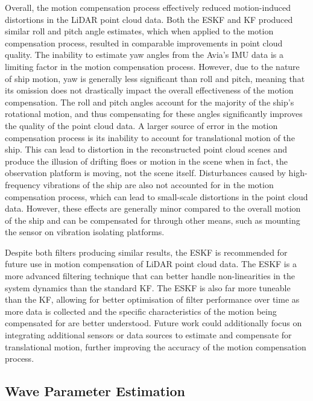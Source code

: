 Overall, the motion compensation process effectively reduced motion-induced distortions in the \ac{LiDAR} point cloud data. Both the \ac{ESKF} and \ac{KF} produced similar roll and pitch angle estimates, which when applied to the motion compensation process, resulted in comparable improvements in point cloud quality. The inability to estimate yaw angles from the Avia's \ac{IMU} data is a limiting factor in the motion compensation process. However, due to the nature of ship motion, yaw is generally less significant than roll and pitch, meaning that its omission does not drastically impact the overall effectiveness of the motion compensation. The roll and pitch angles account for the majority of the ship's rotational motion, and thus compensating for these angles significantly improves the quality of the point cloud data. A larger source of error in the motion compensation process is its inability to account for translational motion of the ship. This can lead to distortion in the reconstructed point cloud scenes and produce the illusion of drifting floes or motion in the scene when in fact, the observation platform is moving, not the scene itself. Disturbances caused by high-frequency vibrations of the ship are also not accounted for in the motion compensation process, which can lead to small-scale distortions in the point cloud data. However, these effects are generally minor compared to the overall motion of the ship and can be compensated for through other means, such as mounting the sensor on vibration isolating platforms.

Despite both filters producing similar results, the \ac{ESKF} is recommended for future use in motion compensation of \ac{LiDAR} point cloud data. The \ac{ESKF} is a more advanced filtering technique that can better handle non-linearities in the system dynamics than the standard \ac{KF}. The \ac{ESKF} is also far more tuneable than the \ac{KF}, allowing for better optimisation of filter performance over time as more data is collected and the specific characteristics of the motion being compensated for are better understood. Future work could additionally focus on integrating additional sensors or data sources to estimate and compensate for translational motion, further improving the accuracy of the motion compensation process.

\subsection{Wave Parameter Estimation}
\label{sec:ch8.section1.subsec3}

